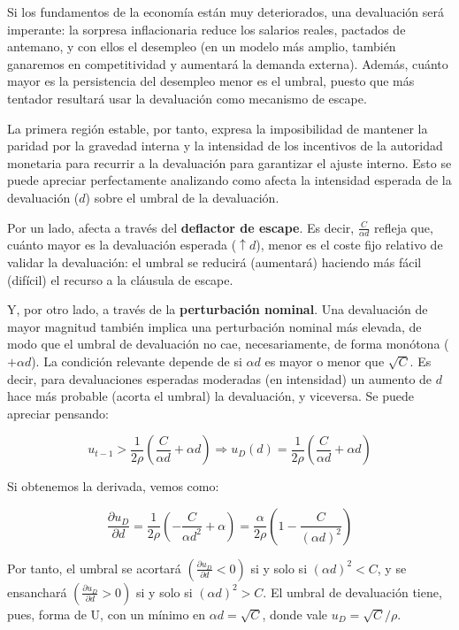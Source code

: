 \documentclass[10pt,a4paper]{article}
\begin{document}
Si los fundamentos de la economía están muy deteriorados, una devaluación será imperante: la sorpresa inflacionaria reduce los salarios reales, pactados de antemano, y con ellos el desempleo (en un modelo más amplio, también ganaremos en competitividad y aumentará la demanda externa). Además, cuánto mayor es la persistencia del desempleo menor es el umbral, puesto que más tentador resultará usar la devaluación como mecanismo de escape.

La primera región estable, por tanto, expresa la imposibilidad de mantener la paridad por la gravedad interna y la intensidad de los incentivos de la autoridad monetaria para recurrir a la devaluación para garantizar el ajuste interno. Esto se puede apreciar perfectamente analizando como afecta la intensidad esperada de la devaluación ($d$) sobre el umbral de la devaluación.

Por un lado, afecta a través del \textbf{deflactor de escape}. Es decir, $\frac{C}{\alpha d}$ refleja que, cuánto mayor es la devaluación esperada ($\uparrow d$), menor es el coste fijo relativo de validar la devaluación: el umbral se reducirá (aumentará) haciendo más fácil (difícil) el recurso a la cláusula de escape.

Y, por otro lado, a través de la \textbf{perturbación nominal}. Una devaluación de mayor magnitud también implica una perturbación nominal más elevada, de modo que el umbral de devaluación no cae, necesariamente, de forma monótona ($+\alpha d$). La condición relevante depende de si $\alpha d$ es mayor o menor que $\sqrt{C}$. Es decir, para devaluaciones esperadas moderadas (en intensidad) un aumento de $d$ hace más probable (acorta el umbral) la devaluación, y viceversa. Se puede apreciar pensando:

$$u_{t-1}>\frac{1}{2\rho}\left(\frac{C}{\alpha d}+\alpha d\right)\Longrightarrow u_{D}(d)=\frac{1}{2\rho}\left(\frac{C}{\alpha d}+\alpha d\right)$$

Si obtenemos la derivada, vemos como:

$$\frac{\partial u_{D}}{\partial d}=\frac{1}{2\rho}\left(-\frac{C}{\alpha d^2}+\alpha\right)=\frac{\alpha}{2\rho}\left(1-\frac{C}{(\alpha d)^2}\right)$$

Por tanto, el umbral se acortará $(\frac{\partial u_{D}}{\partial d}<0)$ si y solo si $(\alpha d)^2<C$, y se ensanchará $(\frac{\partial u_{D}}{\partial d}>0)$ si y solo si $(\alpha d)^2>C$. El umbral de devaluación tiene, pues, forma de U, con un mínimo en $\alpha d=\sqrt{C}$, donde vale $u_D=\sqrt{C}/\rho$.
\end{document}
